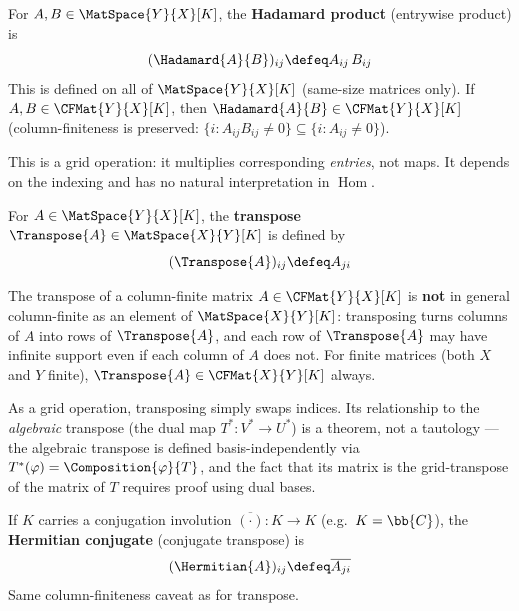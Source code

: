 \begin{definition}
\label{def:hadamard}
    For $A, B \in \MatSpace{Y}{X}[K]$, the \textbf{Hadamard product} (entrywise product) is
    \[
        (\Hadamard{A}{B})_{ij} \defeq A_{ij}\, B_{ij}
    \]
    This is defined on all of $\MatSpace{Y}{X}[K]$ (same-size matrices only).
    If $A, B \in \CFMat{Y}{X}[K]$, then $\Hadamard{A}{B} \in \CFMat{Y}{X}[K]$
    (column-finiteness is preserved: $\{i : A_{ij} B_{ij} \neq 0\}
    \subseteq \{i : A_{ij} \neq 0\}$).

    This is a grid operation: it multiplies corresponding \emph{entries}, not maps. It depends
    on the indexing and has no natural interpretation in $\operatorname{Hom}$.
\end{definition}

\begin{definition}[Transpose]
\label{def:transpose}
    For $A \in \MatSpace{Y}{X}[K]$, the \textbf{transpose} $\Transpose{A} \in \MatSpace{X}{Y}[K]$
    is defined by
    \[
        (\Transpose{A})_{ij} \defeq A_{ji}
    \]
\end{definition}

\begin{remark}
    The transpose of a column-finite matrix $A \in \CFMat{Y}{X}[K]$ is \textbf{not} in general
    column-finite as an element of $\MatSpace{X}{Y}[K]$: transposing turns columns of $A$ into
    rows of $\Transpose{A}$, and each row of $\Transpose{A}$ may have infinite support even if
    each column of $A$ does not. For finite matrices (both $X$ and $Y$ finite),
    $\Transpose{A} \in \CFMat{X}{Y}[K]$ always.
\end{remark}

\begin{remark}
    As a grid operation, transposing simply swaps indices. Its relationship to the
    \emph{algebraic} transpose (the dual map $T^*: V^* \to U^*$) is a theorem, not a
    tautology --- the algebraic transpose is defined basis-independently via
    $T^*(\varphi) = \Composition{\varphi}{T}$, and the fact that its matrix is the
    grid-transpose of the matrix of $T$ requires proof using dual bases.
\end{remark}

\begin{definition}
\label{def:hermitian}
    If $K$ carries a conjugation involution $\overline{(\cdot)}: K \to K$ (e.g.\ $K = \bb{C}$),
    the \textbf{Hermitian conjugate} (conjugate transpose) is
    \[
        (\Hermitian{A})_{ij} \defeq \overline{A_{ji}}
    \]
    Same column-finiteness caveat as for transpose.
\end{definition}


